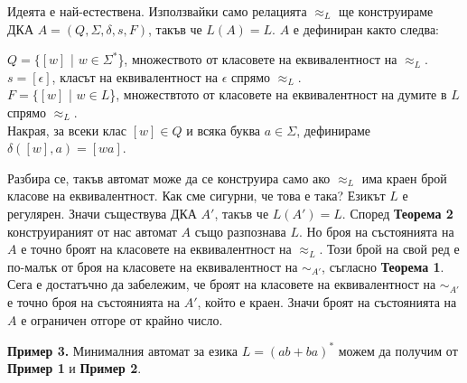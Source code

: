 \documentclass{article}
\begin{document}
    \hspace{15pt} Идеята е най-естествена. Използвайки само релацията $\approx_L$ ще 
    конструираме ДКА $A = (Q,\Sigma,\delta,s,F)$, такъв че $L(A) = L$. $A$ е 
    дефиниран както следва:
    \begin{center}
        $Q = \{[w]$ | $w \in \Sigma^*$\}, множеството от класовете на еквивалентност 
        на $\approx_L$. \\
        $s = [\epsilon]$, класът на еквивалентност на $\epsilon$ спрямо $\approx_L$. \\
        $F = \{[w]$ | $w \in L$\}, множествтото от класовете на еквивалентност на думите
        в $L$ спрямо $\approx_L$. \\
        Накрая, за всеки клас $[w] \in Q$ и всяка буква $a \in \Sigma$, дефинираме
        $\delta([w],a) = [wa]$. 
    \end{center}

    \hspace{15pt} Разбира се, такъв автомат може да се конструира само ако $\approx_L$
    има краен брой класове на еквивалентност. Как сме сигурни, че това е така? Езикът 
    $L$ е регулярен. Значи съществува ДКА $A'$, такъв че $L(A') = L$. Според 
    \textbf{Теорема 2} конструираният от нас автомат $A$ също разпознава $L$. Но 
    броя на състоянията на $A$ е точно броят на класовете на еквивалентност на 
    $\approx_L$. Този брой на свой ред е по-малък от броя на класовете на еквивалентност
    на $\sim_{A'}$, съгласно \textbf{Теорема 1}. Сега е достатъчно
    да забележим, че броят на класовете на еквивалентност на $\sim_{A'}$ е точно
    броя на състоянията на $A'$, който е краен. Значи броят на състоянията на $A$ е
    ограничен отгоре от крайно число.

    \vspace{15pt}

    \textbf{Пример 3.} Минималния автомат за езика $L = (ab + ba)^*$ можем да 
    получим от \textbf{Пример 1} и \textbf{Пример 2}. 
    
    \begin{center}
    \end{center}
     
\end{document}
